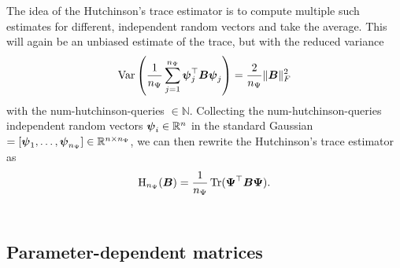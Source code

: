 The idea of the Hutchinson's trace estimator is to compute multiple such estimates
for different, independent random vectors and take the average. This will again
be an unbiased estimate of the trace, but with the reduced variance
\begin{equation}
    \operatorname{Var}\left( \frac{1}{n_{\Psi}} \sum_{j=1}^{n_{\Psi}}\boldsymbol{\psi}_j^{\top} \boldsymbol{B} \boldsymbol{\psi}_j\right) = \frac{2}{n_{\Psi}} \lVert \boldsymbol{B} \rVert _F^2
    \label{equ:2-chebyshev-hutchinson-mse}
\end{equation}
with the \gls{num-hutchinson-queries} $\in \mathbb{N}$.
Collecting the \gls{num-hutchinson-queries} independent random vectors
$\boldsymbol{\psi}_i \in \mathbb{R}^{n}$ in the standard Gaussian
 $= [\boldsymbol{\psi}_1, \dots, \boldsymbol{\psi}_{n_{\Psi}}] \in \mathbb{R}^{n \times n_{\Psi}}$,
we can then rewrite the Hutchinson's trace estimator as
\begin{equation}
    \operatorname{H}_{n_{\Psi}}(\boldsymbol{B}) = \frac{1}{n_{\Psi}} \operatorname{Tr}(\boldsymbol{\Psi}^{\top} \boldsymbol{B} \boldsymbol{\Psi}).
    \label{equ:2-chebyshev-DGC-hutchionson-estimator}
\end{equation}\\

\subsection{Parameter-dependent matrices}
\label{subsec:2-chebyshev-trace-parametrized}

